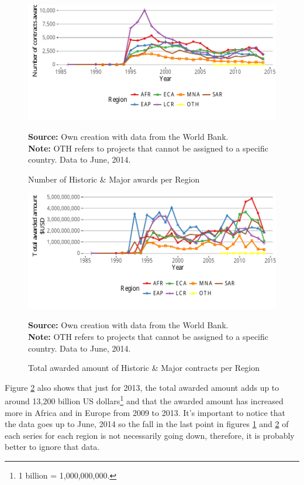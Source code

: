 \begin{figure}[H]
\begin{center}
\caption{Number of Historic \& Major awards per Region}
\label{fig_major_number}
\includegraphics[max width=.95\textwidth]{../img/major_historic_region.pdf}
\end{center}
\noindent \footnotesize{\textbf{Source:} Own creation with data from the World Bank.}\\
\noindent \footnotesize{\textbf{Note:} OTH refers to projects that cannot be assigned to a specific country. Data to June, 2014.}
\end{figure}

\begin{figure}[H]
\begin{center}
\caption{Total awarded amount of Historic \& Major contracts per Region}
\label{fig_major_awarded_usd}
\includegraphics[max width=.95\textwidth]{../img/major_historic_region_awarded_usd.pdf}
\end{center}
\noindent \footnotesize{\textbf{Source:} Own creation with data from the World Bank.}\\
\noindent \footnotesize{\textbf{Note:} OTH refers to projects that cannot be assigned to a specific country. Data to June, 2014.}
\end{figure}


Figure \ref{fig_major_awarded_usd} also shows that just for 2013, the total awarded amount adds up to around 13,200 billion US dollars\footnote{1 billion = 1,000,000,000.} and that the awarded amount has increased more in Africa and in Europe from 2009 to 2013. 
It's important to notice that the data goes up to June, 2014 so the fall in the last point in figures  \ref{fig_major_number} and \ref{fig_major_awarded_usd} of each series for each region is not necessarily going down, therefore, it is probably better to ignore that data.


